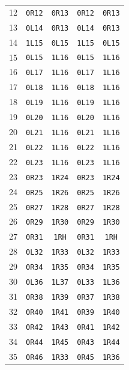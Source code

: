 \begin{longtable}{rcccc}
12 & \texttt{0R12} & \texttt{0R13} & \texttt{0R12} & \texttt{0R13} \\
13 & \texttt{0L14} & \texttt{0R13} & \texttt{0L14} & \texttt{0R13} \\
14 & \texttt{1L15} & \texttt{0L15} & \texttt{1L15} & \texttt{0L15} \\
15 & \texttt{0L15} & \texttt{1L16} & \texttt{0L15} & \texttt{1L16} \\
16 & \texttt{0L17} & \texttt{1L16} & \texttt{0L17} & \texttt{1L16} \\
17 & \texttt{0L18} & \texttt{1L16} & \texttt{0L18} & \texttt{1L16} \\
18 & \texttt{0L19} & \texttt{1L16} & \texttt{0L19} & \texttt{1L16} \\
19 & \texttt{0L20} & \texttt{1L16} & \texttt{0L20} & \texttt{1L16} \\
20 & \texttt{0L21} & \texttt{1L16} & \texttt{0L21} & \texttt{1L16} \\
21 & \texttt{0L22} & \texttt{1L16} & \texttt{0L22} & \texttt{1L16} \\
22 & \texttt{0L23} & \texttt{1L16} & \texttt{0L23} & \texttt{1L16} \\
23 & \texttt{0R23} & \texttt{1R24} & \texttt{0R23} & \texttt{1R24} \\
24 & \texttt{0R25} & \texttt{1R26} & \texttt{0R25} & \texttt{1R26} \\
25 & \texttt{0R27} & \texttt{1R28} & \texttt{0R27} & \texttt{1R28} \\
26 & \texttt{0R29} & \texttt{1R30} & \texttt{0R29} & \texttt{1R30} \\
27 & \texttt{0R31} & \texttt{1RH} & \texttt{0R31} & \texttt{1RH} \\
28 & \texttt{0L32} & \texttt{1R33} & \texttt{0L32} & \texttt{1R33} \\
29 & \texttt{0R34} & \texttt{1R35} & \texttt{0R34} & \texttt{1R35} \\
30 & \texttt{0L36} & \texttt{1L37} & \texttt{0L33} & \texttt{1L36} \\
31 & \texttt{0R38} & \texttt{1R39} & \texttt{0R37} & \texttt{1R38} \\
32 & \texttt{0R40} & \texttt{1R41} & \texttt{0R39} & \texttt{1R40} \\
33 & \texttt{0R42} & \texttt{1R43} & \texttt{0R41} & \texttt{1R42} \\
34 & \texttt{0R44} & \texttt{1R45} & \texttt{0R43} & \texttt{1R44} \\
35 & \texttt{0R46} & \texttt{1R33} & \texttt{0R45} & \texttt{1R36} \\

\end{longtable}
